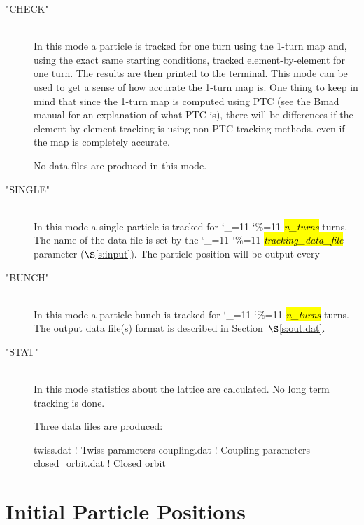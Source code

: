 \documentclass{hitec}
\newcommand\dottcmd[1]{\hl{\em#1}\endgroup}
\newcommand{\vn}{\begingroup\catcode`\_=11 \catcode`\%=11 \dottcmd}
\newcommand{\Newline}{\hfil \\}
\newcommand{\sref}[1]{$\S$\ref{#1}}
\newcommand{\Section}[1]{\section{#1}\vspace*{-1ex}}
\begin{document}
\begin{description}
\item["CHECK"] \Newline
In this mode a particle is tracked for one turn using the 1-turn map and, using the exact same
starting conditions, tracked element-by-element for one turn. The results are then printed to the
terminal. This mode can be used to get a sense of how accurate the 1-turn map is. One thing to keep
in mind that since the 1-turn map is computed using PTC (see the Bmad manual for an explanation of
what PTC is), there will be differences if the element-by-element tracking is using non-PTC tracking
methods. even if the map is completely accurate. 

No data files are produced in this mode.
%
\item["SINGLE"] \Newline
In this mode a single particle is tracked for \vn{n_turns} turns. The name of the data file is set
by the \vn{tracking_data_file} parameter (\sref{s:input}). The particle position will be output every

%
\item["BUNCH"] \Newline
In this mode a particle bunch is tracked for \vn{n_turns} turns. The output data file(s) format is
described in Section~\sref{s:out.dat}.
%
\item["STAT"] \Newline
In this mode statistics about the lattice are calculated. No long term tracking is done.

Three data files are produced: 
\begin{code}
  twiss.dat         ! Twiss parameters
  coupling.dat      ! Coupling parameters
  closed_orbit.dat  ! Closed orbit
\end{code}
\end{description}


\Section{Initial Particle Positions}
\label{s:init.pos}
\end{document}
